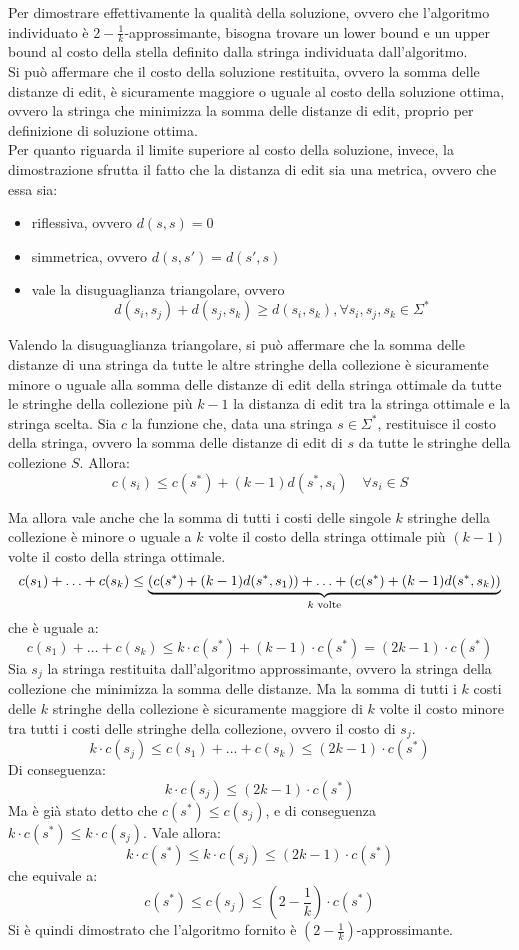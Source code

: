 Per dimostrare effettivamente la qualità della soluzione, ovvero che
l'algoritmo individuato è $2-\frac{1}{k}$-approssimante, bisogna trovare
un lower bound e un upper bound al costo della stella definito dalla stringa
individuata dall'algoritmo.\\
Si può affermare che il costo della soluzione restituita, ovvero
la somma delle distanze di edit, è sicuramente maggiore o uguale
al costo della soluzione ottima, ovvero la stringa che minimizza la
somma delle distanze di edit, proprio per definizione di soluzione ottima.\\
Per quanto riguarda il limite superiore al costo della soluzione, invece,
la dimostrazione sfrutta il fatto che la distanza di edit sia una metrica,
ovvero che essa sia:
\begin{itemize}
    \item riflessiva, ovvero $d(s, s) = 0$
    \item simmetrica, ovvero $d(s, s') = d(s', s)$
    \item vale la disuguaglianza triangolare, ovvero
    \[
    d(s_i,s_j) + d(s_j,s_k) \ge d(s_i,s_k), \forall s_i,s_j,s_k \in \Sigma^*
    \]
\end{itemize}

Valendo la disuguaglianza triangolare, si può affermare che la somma delle distanze
di una stringa da tutte le altre stringhe della collezione è sicuramente
minore o uguale alla somma delle distanze di edit della stringa ottimale da
tutte le stringhe della collezione più $k-1$ la distanza di edit tra la stringa
ottimale e la stringa scelta.
Sia $c$ la funzione che, data una stringa $s \in \Sigma^*$, restituisce il costo
della stringa, ovvero la somma delle distanze di edit di $s$ da tutte le stringhe
della collezione $S$. Allora:
\[
    c(s_i) \le c(s^*) + (k-1)d(s^*, s_i) \quad \forall s_i \in S
\]

Ma allora vale anche che la somma di tutti i costi delle singole $k$ stringhe della
collezione è minore o uguale a $k$ volte il costo della stringa ottimale più
$(k-1)$ volte il costo della stringa ottimale.
\[
    c(s_1)+\ldots+c(s_k) \le
    \underbrace{\left(c(s^*) + (k-1)d(s^*, s_1)\right) +
                \ldots +
                \left(c(s^*) + (k-1)d(s^*, s_k)\right)}
            _{k \text{ volte}}
\]
che è uguale a:
\[
    c(s_1)+\ldots+c(s_k) \le k \cdot c(s^*) + (k-1) \cdot c(s^*) = (2k-1) \cdot c(s^*)
\]
Sia $s_j$ la stringa restituita dall'algoritmo approssimante, ovvero la stringa
della collezione che minimizza la somma delle distanze.
Ma la somma di tutti i $k$ costi delle $k$ stringhe della collezione è sicuramente
maggiore di $k$ volte il costo minore tra tutti i costi delle stringhe della collezione,
ovvero il costo di $s_j$.
\[
    k \cdot c(s_j) \le c(s_1)+\ldots+c(s_k) \le (2k-1) \cdot c(s^*)
\]
Di conseguenza:
\[
    k \cdot c(s_j) \le (2k-1) \cdot c(s^*)
\]
Ma è già stato detto che $c(s^*) \le c(s_j)$, e di conseguenza
$k \cdot c(s^*) \le k \cdot c(s_j)$. Vale allora:
\[
    k \cdot c(s^*) \le k \cdot c(s_j) \le (2k-1) \cdot c(s^*)
\]
che equivale a:
\[
    c(s^*) \le c(s_j) \le (2-\frac{1}{k}) \cdot c(s^*)
\]
Si è quindi dimostrato che l'algoritmo fornito è $(2-\frac{1}{k})$-approssimante.
